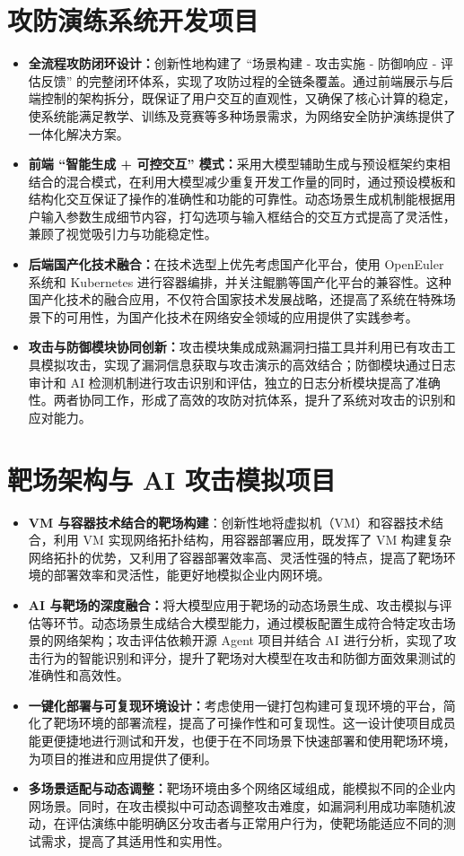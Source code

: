 \documentclass[lang=cn,10pt]{elegantbook}
\begin{document}
\section{攻防演练系统开发项目}
\begin{itemize}
    \item \textbf{全流程攻防闭环设计：}创新性地构建了 “场景构建 - 攻击实施 - 防御响应 - 评估反馈” 的完整闭环体系，实现了攻防过程的全链条覆盖。通过前端展示与后端控制的架构拆分，既保证了用户交互的直观性，又确保了核心计算的稳定，使系统能满足教学、训练及竞赛等多种场景需求，为网络安全防护演练提供了一体化解决方案。
    \item \textbf{前端 “智能生成 + 可控交互” 模式：}采用大模型辅助生成与预设框架约束相结合的混合模式，在利用大模型减少重复开发工作量的同时，通过预设模板和结构化交互保证了操作的准确性和功能的可靠性。动态场景生成机制能根据用户输入参数生成细节内容，打勾选项与输入框结合的交互方式提高了灵活性，兼顾了视觉吸引力与功能稳定性。
    \item \textbf{后端国产化技术融合：}在技术选型上优先考虑国产化平台，使用 OpenEuler 系统和 Kubernetes 进行容器编排，并关注鲲鹏等国产化平台的兼容性。这种国产化技术的融合应用，不仅符合国家技术发展战略，还提高了系统在特殊场景下的可用性，为国产化技术在网络安全领域的应用提供了实践参考。
    \item \textbf{攻击与防御模块协同创新：}攻击模块集成成熟漏洞扫描工具并利用已有攻击工具模拟攻击，实现了漏洞信息获取与攻击演示的高效结合；防御模块通过日志审计和 AI 检测机制进行攻击识别和评估，独立的日志分析模块提高了准确性。两者协同工作，形成了高效的攻防对抗体系，提升了系统对攻击的识别和应对能力。
\end{itemize}

\section{靶场架构与 AI 攻击模拟项目}
\begin{itemize}
    \item \textbf{VM 与容器技术结合的靶场构建}：创新性地将虚拟机（VM）和容器技术结合，利用 VM 实现网络拓扑结构，用容器部署应用，既发挥了 VM 构建复杂网络拓扑的优势，又利用了容器部署效率高、灵活性强的特点，提高了靶场环境的部署效率和灵活性，能更好地模拟企业内网环境。
    \item \textbf{AI 与靶场的深度融合：}将大模型应用于靶场的动态场景生成、攻击模拟与评估等环节。动态场景生成结合大模型能力，通过模板配置生成符合特定攻击场景的网络架构；攻击评估依赖开源 Agent 项目并结合 AI 进行分析，实现了攻击行为的智能识别和评分，提升了靶场对大模型在攻击和防御方面效果测试的准确性和高效性。
    \item \textbf{一键化部署与可复现环境设计：}考虑使用一键打包构建可复现环境的平台，简化了靶场环境的部署流程，提高了可操作性和可复现性。这一设计使项目成员能更便捷地进行测试和开发，也便于在不同场景下快速部署和使用靶场环境，为项目的推进和应用提供了便利。
    \item \textbf{多场景适配与动态调整：}靶场环境由多个网络区域组成，能模拟不同的企业内网场景。同时，在攻击模拟中可动态调整攻击难度，如漏洞利用成功率随机波动，在评估演练中能明确区分攻击者与正常用户行为，使靶场能适应不同的测试需求，提高了其适用性和实用性。
\end{itemize}
\end{document}
